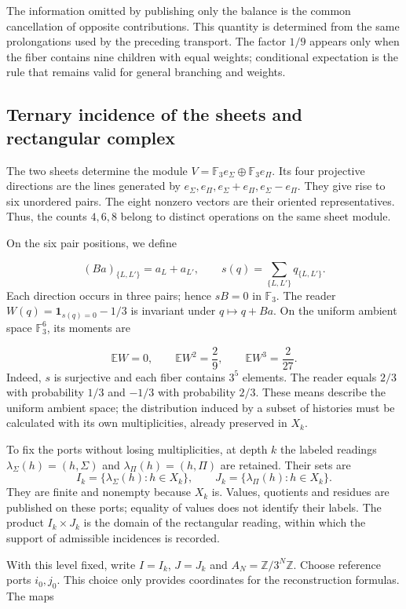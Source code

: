 The information omitted by publishing only the balance is the common cancellation of opposite contributions. This quantity is determined from the same prolongations used by the preceding transport. The factor \(1/9\) appears only when the fiber contains nine children with equal weights; conditional expectation is the rule that remains valid for general branching and weights.

\subsection{Ternary incidence of the sheets and rectangular complex}
\label{x_reciprocidad:iv:cont:incidencia-rectangular}
The two sheets determine the module \(V=\mathbb F_3e_\Sigma\oplus\mathbb F_3e_\Pi\). Its four projective directions are the lines generated by \(e_\Sigma,e_\Pi,e_\Sigma+e_\Pi,e_\Sigma-e_\Pi\). They give rise to six unordered pairs. The eight nonzero vectors are their oriented representatives. Thus, the counts \(4,6,8\) belong to distinct operations on the same sheet module.

On the six pair positions, we define

\[
(Ba)_{\{L,L'\}}=a_L+a_{L'},
\qquad
s(q)=\sum_{\{L,L'\}}q_{\{L,L'\}}.
\]
Each direction occurs in three pairs; hence \(sB=0\) in \(\mathbb F_3\). The reader \(W(q)=\mathbf1_{s(q)=0}-1/3\) is invariant under \(q\mapsto q+Ba\). On the uniform ambient space \(\mathbb F_3^6\), its moments are

\[
\mathbb EW=0,\qquad
\mathbb EW^2=\frac29,\qquad
\mathbb EW^3=\frac2{27}.
\]
Indeed, \(s\) is surjective and each fiber contains \(3^5\) elements. The reader equals \(2/3\) with probability \(1/3\) and \(-1/3\) with probability \(2/3\). These means describe the uniform ambient space; the distribution induced by a subset of histories must be calculated with its own multiplicities, already preserved in \(X_k\).

To fix the ports without losing multiplicities, at depth \(k\) the labeled readings \(\lambda_\Sigma(h)=(h,\Sigma)\) and \(\lambda_\Pi(h)=(h,\Pi)\) are retained. Their sets are
\[
I_k=\{\lambda_\Sigma(h):h\in X_k\},\qquad
J_k=\{\lambda_\Pi(h):h\in X_k\}.
\]
They are finite and nonempty because \(X_k\) is. Values, quotients and residues are published on these ports; equality of values does not identify their labels. The product \(I_k\times J_k\) is the domain of the rectangular reading, within which the support of admissible incidences is recorded.

With this level fixed, write \(I=I_k\), \(J=J_k\) and \(A_N=\mathbb Z/3^N\mathbb Z\). Choose reference ports \(i_0,j_0\). This choice only provides coordinates for the reconstruction formulas. The maps

